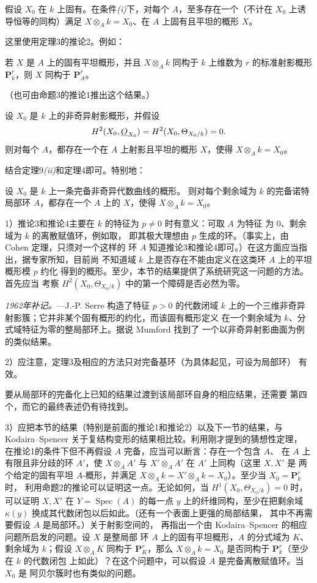  假设 $X_0$ 在 $k$ 上固有。在条件\textit{(i)}下，对每个
$A$，至多存在一个（不计在 $X_0$ 上诱导恒等的同构）满足
$X\otimes_A k=X_0$、在 $A$ 上固有且平坦的概形 $X$。

这里使用定理3的推论2。例如：

 若 $X$ 是 $A$ 上的固有平坦概形，并且
$X\otimes_A k$ 同构于 $k$ 上维数为 $r$ 的标准射影概形
$\mathbf P_k^r$，则 $X$ 同构于 $\mathbf P_A^r$。

（也可由命题3的推论1推出这个结果。）

 设 $X_0$ 是 $k$ 上的非奇异射影概形，并假设
\[
  H^2(X_0,\underline{O}_{X_0})=H^2(X_0,\Theta_{X_0/k})=0.
\]
则对每个 $A$，都存在一个在 $A$ 上射影且平坦的概形 $X$，使得
$X\otimes_A k=X_0$。

结合定理9\textit{(ii)}和定理4即可。特别地：

 设 $X_0$ 是 $k$ 上一条完备非奇异代数曲线的概形。
则对每个剩余域为 $k$ 的完备诺特局部环 $A$，都存在一个 $A$ 上的
 $X$，使得 $X\otimes_A k=X_0$。


1）推论3和推论4主要在 $k$ 的特征为 $p\ne0$ 时有意义：可取 $A$ 为特征
为 $0$、剩余域为 $k$ 的离散赋值环，例如取，
即其极大理想由 $p$ 生成的环。（事实上，由 Cohen 定理，只须对一个这样的
环 $A$ 知道推论3和推论4即可。）在这方面应当指出，据专家所知，目前尚
不知道域 $k$ 上是否存在不能由定义在这类环 $A$ 上的平坦概形模 $p$ 约化
得到的概形。至少，本节的结果提供了系统研究这一问题的方法。首先应当
考察 $H^2(X_0,\Theta_{X_0/k})$ 中的第一个障碍是否必然为零。

\emph{1962年补记。}---J.-P. Serre 构造了特征 $p>0$ 的代数闭域 $k$
上的一个三维非奇异射影簇；它并非某个固有概形的约化，而该固有概形定义
在一个剩余域为 $k$、分式域特征为零的整局部环上。据说 Mumford 找到了
一个以非奇异射影曲面为例的类似结果。

2）应注意，定理3及相应的方法只对完备基环（为具体起见，可设为局部环）
有效。

要从局部环的完备化上已知的结果过渡到该局部环自身的相应结果，还需要
第四个，而它的最终表述仍有待找到。

3）应把本节的结果（特别是前面的推论1和推论2）以及下一节的结果，与
Kodaira--Spencer 关于复结构变形的结果相比较。利用刚才提到的猜想性定理，
在推论1的条件下但不再假设 $A$ 完备，应当可以断言：存在一个包含 $A$、
在 $A$ 上有限且非分歧的环 $A'$，使
$X\otimes_A A'$ 与 $X'\otimes_A A'$ 在 $A'$ 上同构（这里 $X,X'$ 是
两个给定的固有平坦 $A$-概形，并满足
$X\otimes_A k=X'\otimes_A k=X_0$）。至少当 $X_0=\mathbf P_k^r$ 时，
利用命题2的推论可以证明这一点。无论如何，当
$H^1(X_0,\Theta_{X_0/k})=0$ 时，可以证明 $X,X'$ 在
$Y=\operatorname{Spec}(A)$ 的每一点 $y$ 上的纤维同构，至少在把剩余域
$\kappa(y)$ 换成其代数闭包以后如此。（还有一个表面上更强的局部结果，
其中不再需要假设 $A$ 是局部环。）关于射影空间的，
再指出一个由 Kodaira--Spencer 的相应问题所启发的问题。设 $X$ 是整局部
环 $A$ 上的固有平坦概形，$A$ 的分式域为 $K$、剩余域为 $k$；假设
$X\otimes_A K$ 同构于 $\mathbf P_K^r$，那么
$X\otimes_A k=X_0$ 是否同构于 $\mathbf P_k^r$（至少在 $k$ 的代数闭包
上如此）？在这个问题中，可以假设 $A$ 是完备离散赋值环。当 $X_0$ 是
阿贝尔簇时也有类似的问题。

